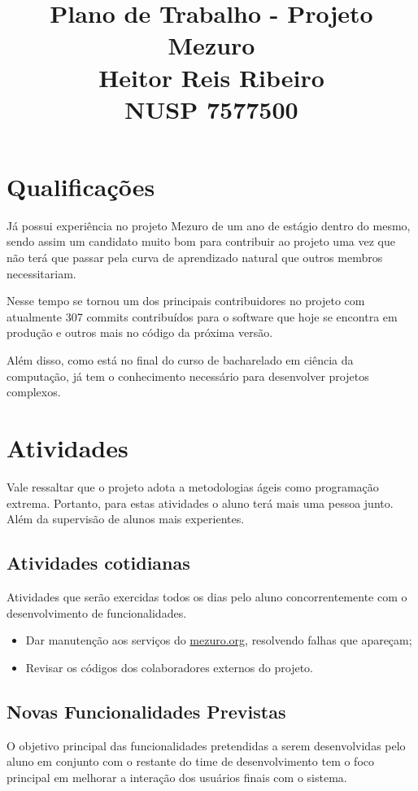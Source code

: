 \documentclass[12pt]{article}
\begin{document}
  \title{Plano de Trabalho - Projeto Mezuro\\
         Heitor Reis Ribeiro\\
         NUSP 7577500}

  \maketitle

  \section{Qualificações}
  Já possui experiência no projeto Mezuro de um ano de estágio dentro do mesmo, sendo assim um candidato muito bom para contribuir ao projeto uma vez que não terá que passar pela curva de aprendizado natural que outros membros necessitariam.

  Nesse tempo se tornou um dos principais contribuidores no projeto com atualmente 307 commits contribuídos para o software que hoje se encontra em produção e outros mais no código da próxima versão.

  Além disso, como está no final do curso de bacharelado em ciência da computação, já tem o conhecimento necessário para desenvolver projetos complexos.

  \section{Atividades}
    Vale ressaltar que o projeto adota a metodologias ágeis como programação extrema. Portanto, para estas atividades o aluno terá mais uma pessoa junto. Além da supervisão de alunos mais experientes.

    \subsection{Atividades cotidianas}
      Atividades que serão exercidas todos os dias pelo aluno concorrentemente com o desenvolvimento de funcionalidades.

      \begin{itemize}
        \item Dar manutenção aos serviços do \url{mezuro.org}, resolvendo falhas que apareçam;
        \item Revisar os códigos dos colaboradores externos do projeto.
      \end{itemize}

    \subsection{Novas Funcionalidades Previstas}\label{subsec:func-prev}
      O objetivo principal das funcionalidades pretendidas a serem desenvolvidas pelo aluno em conjunto com o restante do time de desenvolvimento tem o foco principal em melhorar a interação dos usuários finais com o sistema.
\end{document}
